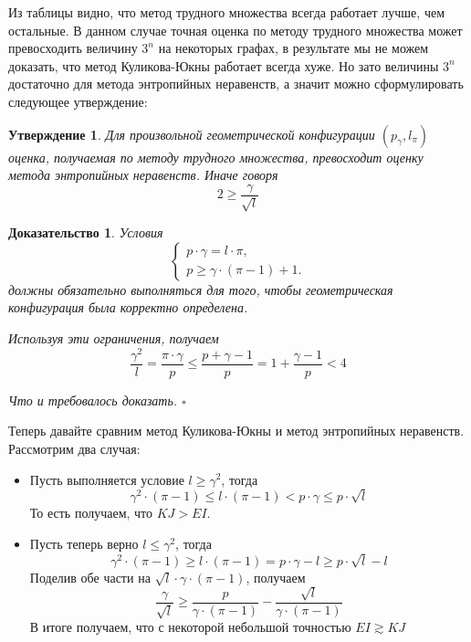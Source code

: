 \documentclass[a4paper]{article}
\newtheorem*{mclaim}{Утверждение}
\newtheorem*{msolution}{Доказательство}
\begin{document}
Из таблицы видно, что метод трудного множества всегда работает лучше, чем остальные. В данном случае 
точная оценка по методу трудного множества может превосходить величину $3^n$ на некоторых графах, в 
результате мы не можем доказать, что метод Куликова-Юкны работает всегда хуже. Но зато величины $3^n$ 
достаточно для метода энтропийных неравенств, а значит можно сформулировать следующее утверждение:

\begin{mclaim}
    Для произвольной геометрической конфигурации $(p_{\gamma}, l_{\pi})$ оценка, получаемая по методу 
    трудного множества, превосходит оценку метода энтропийных неравенств. Иначе говоря 
    $$2 \geq \frac{\gamma}{\sqrt{l}}$$
\end{mclaim}

\begin{msolution}
	Условия 
	\begin{equation*}
	    \begin{cases}
			p\cdot \gamma = l\cdot \pi, \\
			p \geq \gamma\cdot (\pi - 1) + 1.
		\end{cases}
	\end{equation*}
	должны обязательно выполняться для того, чтобы геометрическая конфигурация была корректно определена.
	
	Используя эти ограничения, получаем $$\frac{\gamma^2}{l} = \frac{\pi\cdot\gamma}{p} \leq \frac{p + 
	\gamma - 1}{p} = 1 + \frac{\gamma - 1}{p} < 4$$
	
	Что и требовалось доказать. $\square$
\end{msolution}

Теперь давайте сравним метод Куликова-Юкны и метод энтропийных неравенств. Рассмотрим два случая:
\begin{itemize}[noitemsep]
    \item Пусть выполняется условие $l \geq \gamma^2$, тогда $$\gamma^2 \cdot (\pi - 1) \leq l \cdot (\pi - 1) 
    < p\cdot\gamma \leq p\cdot\sqrt{l}$$ То есть получаем, что $KJ > EI$.
    \item Пусть теперь верно $l \leq \gamma^2$, тогда $$\gamma^2\cdot (\pi - 1) \geq l\cdot(\pi - 1) = 
    p\cdot\gamma - l \geq p\cdot\sqrt{l} - l$$ Поделив обе части на $\sqrt{l}\cdot\gamma\cdot(\pi -1)$, 
    получаем $$\frac{\gamma}{\sqrt{l}} \geq \frac{p}{\gamma\cdot(\pi - 1)} - \frac{\sqrt{l}}{\gamma\cdot(\pi-1)}$$
	В итоге получаем, что с некоторой небольшой точностью $EI \gtrsim KJ$
\end{itemize}
\end{document}
